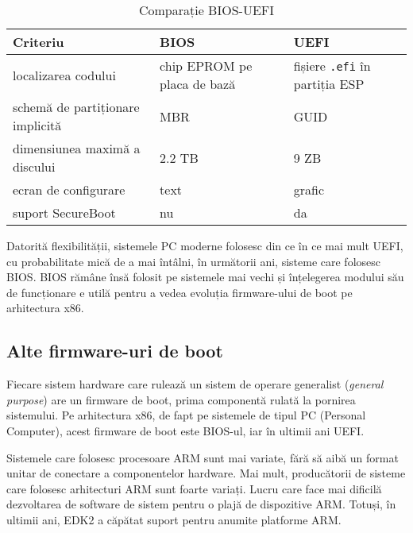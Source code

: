 \begin{table}[!htb]
  \begin{center}
    \begin{tabular}{ p{} p{} p{} }
      \toprule
        \textbf{Criteriu} &
        \textbf{BIOS} &
        \textbf{UEFI} \\
      \midrule
        localizarea codului &
        chip EPROM pe placa de bază &
        fișiere \texttt{.efi} în partiția ESP \\

        schemă de partiționare implicită &
        MBR &
        GUID \\

        dimensiunea maximă a discului &
        2.2 TB &
        9 ZB \\

        ecran de configurare &
        text &
        grafic \\

        suport SecureBoot &
        nu &
        da \\

      \bottomrule
    \end{tabular}
  \end{center}
  \caption{Comparație BIOS-UEFI}
  \label{tab:boot:bios-uefi}
\end{table}

Datorită flexibilității, sistemele PC  moderne
folosesc din ce în ce mai mult UEFI, cu probabilitate mică de a mai întâlni, în următorii ani,
sisteme care folosesc BIOS. BIOS rămâne însă folosit pe
sistemele mai vechi și înțelegerea modului său de funcționare e utilă pentru a
vedea evoluția firmware-ului de boot pe arhitectura x86.

\subsection{Alte firmware-uri de boot}
\label{sec:boot:other}

Fiecare sistem hardware care rulează un sistem de operare generalist (\textit{general
purpose}) are un firmware de boot, prima componentă rulată la pornirea
sistemului. Pe arhitectura x86, de fapt pe sistemele de tipul PC (Personal
Computer), acest firmware de boot este BIOS-ul, iar în ultimii ani UEFI.

Sistemele care folosesc procesoare ARM sunt mai variate, fără să aibă un format
unitar de conectare a componentelor hardware. Mai mult, producătorii de sisteme
care folosesc arhitecturi ARM sunt foarte variați. Lucru care face mai dificilă
dezvoltarea de software de sistem pentru o plajă de dispozitive ARM. Totuși,
în ultimii ani, EDK2 a căpătat suport pentru anumite platforme ARM.

